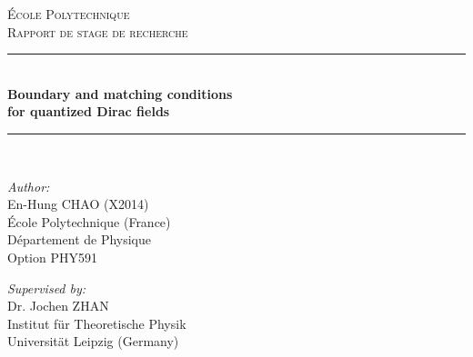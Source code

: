 
\begin{titlepage}

\newcommand{\HRule}{\rule{\linewidth}{0.5mm}} %

\center %
 

\textsc{\LARGE {\'E}cole Polytechnique  }\\[0.3cm] %
\textsc{\Large Rapport de stage de recherche}\\[0.5cm] %


\HRule \\[0.4cm]
{ \huge \bfseries Boundary and matching conditions \\ for quantized Dirac fields}\\[0.03cm] %
\HRule \\[1.5cm]

 

\begin{minipage}{0.4\textwidth}
\begin{flushleft} \large
\emph{Author:}\\
En-Hung CHAO (X2014) \\ {\'E}cole Polytechnique (France) \\D{\'e}partement de Physique\\ Option PHY591 %
~
\end{flushleft}
\end{minipage}
\begin{minipage}{0.4\textwidth}
\begin{flushright} \large
\emph{Supervised by:} \\
Dr. Jochen ZHAN\\Institut f{\"u}r Theoretische Physik\\Universit{\"a}t Leipzig (Germany) %
\end{flushright}
\end{minipage}\\[1cm]


\end{titlepage}

